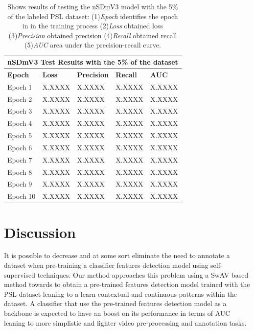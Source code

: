 \documentclass[twocolumn,conference]{article}
\begin{document}
\begin{table}
\captionsetup{font=footnotesize}
\centering
\begin{tabular}{ p{2.8cm} p{2.8cm} p{2.8cm} p{2.8cm} p{2.8cm} }
\toprule
\multicolumn{5}{c}{\textbf{nSDmV3 Test Results with the 5\% of the dataset}} \\
\hline
\hline
\textbf{Epoch}&	\textbf{Loss}	&\textbf{Precision}	&\textbf{Recall}	&\textbf{AUC} \\
\hline
\midrule
Epoch 1&	X.XXXX&	X.XXXX&	X.XXXX&	X.XXXX\\
Epoch 2&	X.XXXX&	X.XXXX&	X.XXXX&	X.XXXX\\
Epoch 3&	X.XXXX&	X.XXXX&	X.XXXX&	X.XXXX\\
Epoch 4&	X.XXXX&	X.XXXX&	X.XXXX&	X.XXXX\\
Epoch 5&	X.XXXX&	X.XXXX&	X.XXXX&	X.XXXX\\
Epoch 6&	X.XXXX&	X.XXXX&	X.XXXX&	X.XXXX\\
Epoch 7&	X.XXXX&	X.XXXX&	X.XXXX&	X.XXXX\\
Epoch 8&	X.XXXX&	X.XXXX&	X.XXXX&	X.XXXX\\
Epoch 9&	X.XXXX&	X.XXXX&	X.XXXX&	X.XXXX\\
Epoch 10&	X.XXXX&	X.XXXX&	X.XXXX&	X.XXXX\\
\bottomrule
\end{tabular}
\caption{Shows results of testing the nSDmV3 model with the 5\% of the labeled PSL dataset: (1)\textit{Epoch} identifies the epoch in in the training process (2)\textit{Loss} obtained loss (3)\textit{Precision} obtained precision (4)\textit{Recall} obtained recall (5)\textit{AUC} area under the precision-recall curve.}
\label{tab:nSDmV3-detection-results-5-percent}
\end{table}

\section{Discussion}\label{discussion}
It is possible to decrease and at some sort eliminate the need to annotate a dataset when pre-training a classifier features detection model using self-supervised techniques.  Our method approaches this problem using a SwAV based method towards to obtain a pre-trained features detection model trained with the PSL dataset leaning to a learn contextual and continuous patterns within the dataset. A classifier that use the pre-trained features detection model as a backbone is expected to have an boost on its performance in terms of AUC leaning to more simplistic and lighter video pre-processing and annotation tasks.
\end{document}
